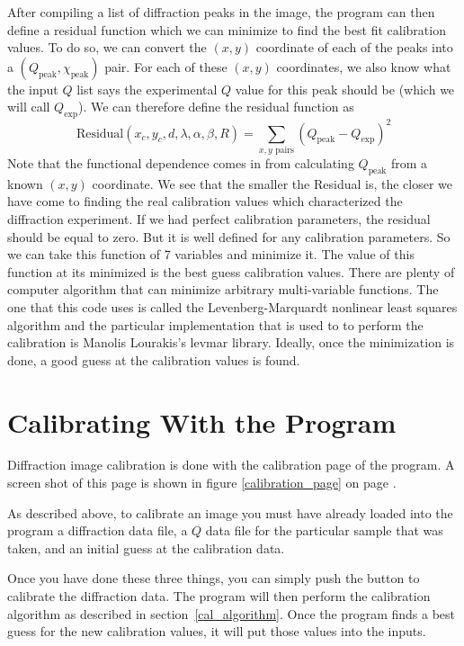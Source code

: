 After compiling a list of diffraction peaks in the image,
the program can then define a residual function which
we can minimize to find the best fit calibration values.
To do so, we can convert the $(x,y)$ coordinate
of each of the peaks into a 
$(Q_{\text{peak}},\chi_{\text{peak}})$ pair. 
For each of these $(x,y)$ coordinates, we also
know what the input $Q$ list says the experimental $Q$ 
value for this peak should be (which we will call 
$Q_{\text{exp}}$). We can therefore define
the residual function as
\begin{equation}\label{residual}
    \text{Residual}(x_c,y_c,d,\lambda,\alpha,\beta,R) =  
        \sum_{\text{$x,y$ pairs}}
        (Q_{\text{peak}} - Q_{\text{exp}})^2
\end{equation}
Note that the functional dependence comes in from
calculating $Q_{\text{peak}}$ from a known
$(x,y)$ coordinate. We see that the smaller the 
Residual is, the closer we have come to finding 
the real calibration values which characterized
the diffraction experiment. If we had perfect
calibration parameters, the residual should be
equal to zero. But it is well defined for any
calibration parameters. So we can take this 
function of 7 variables and minimize it. 
The value of this function at its minimized 
is the best guess calibration values.
There are plenty of computer algorithm that
can minimize arbitrary multi-variable functions.
The one that this code uses is called the 
Levenberg-Marquardt
nonlinear least squares algorithm
and the particular implementation that is used
to to perform the calibration is Manolis Lourakis's
levmar library\cite{lourakis04LM}. Ideally, 
once the minimization is done, a good guess at the
calibration values is found.

\section{Calibrating With the Program}

Diffraction image calibration is done with the
calibration page of the program. A screen shot
of this page is shown in figure
\ref{calibration_page} on page
\pageref{calibration_page}.

As described above, to calibrate an image
you must have already loaded into the program
a diffraction data file, a $Q$ data 
file for the particular sample that was
taken, and an initial guess at the calibration 
data.

Once you have done these three things, you can
simply push the  button to
calibrate the diffraction data. The program will
then perform the calibration algorithm as described
in section~\ref{cal_algorithm}. Once the program
finds a best guess for the new calibration
values, it will put those values into the inputs. 

